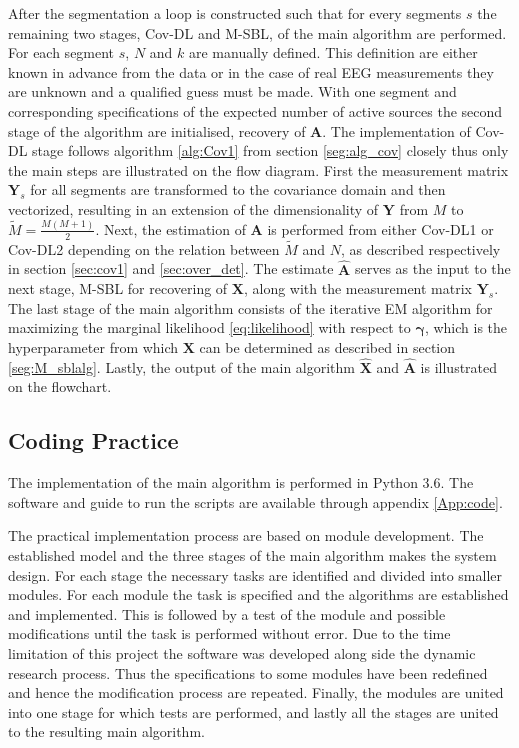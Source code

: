After the segmentation a loop is constructed such that for every segments $s$ the remaining two stages, Cov-DL and M-SBL, of the main algorithm are performed. 
For each segment $s$, $N$ and $k$ are manually defined. 
This definition are either known in advance from the data or in the case of real EEG measurements they are unknown and a qualified guess must be made.
With one segment and corresponding specifications of the expected number of active sources the second stage of the algorithm are initialised, recovery of $\mathbf{A}$.
The implementation of Cov-DL stage follows algorithm \ref{alg:Cov1} from section \ref{seg:alg_cov} closely thus only the main steps are illustrated on the flow diagram.
First the measurement matrix $\mathbf{Y}_s$ for all segments are transformed to the covariance domain and then vectorized, resulting in an extension of the dimensionality of $\mathbf{Y}$ from $M$ to $\widetilde{M} = \frac{M(M+1)}{2}$.
Next, the estimation of $\mathbf{A}$ is performed from either Cov-DL1 or Cov-DL2 depending on the relation between $\widetilde{M}$ and $N$, as described respectively in section \ref{sec:cov1} and \ref{sec:over_det}.
The estimate $\hat{\mathbf{A}}$ serves as the input to the next stage, M-SBL for recovering of $\mathbf{X}$, along with the measurement matrix $\mathbf{Y}_s$. 
The last stage of the main algorithm consists of the iterative EM algorithm for maximizing the marginal likelihood \eqref{eq:likelihood} with respect to $\boldsymbol{\gamma}$, which is the hyperparameter from which $\mathbf{X}$ can be determined as described in section \ref{seg:M_sblalg}. 
Lastly, the output of the main algorithm $\hat{\mathbf{X}}$ and $\hat{\mathbf{A}}$ is illustrated on the flowchart.

\subsection{Coding Practice}
The implementation of the main algorithm is performed in Python 3.6. The software and guide to run the scripts are available through appendix \ref{App:code}.

The practical implementation process are based on module development. 
The established model and the three stages of the main algorithm makes the system design. 
For each stage the necessary tasks are identified and divided into smaller modules. 
For each module the task is specified and the algorithms are established and implemented. 
This is followed by a test of the module and possible modifications until the task is performed without error. 
Due to the time limitation of this project the software was developed along side the dynamic research process. 
Thus the specifications to some modules have been redefined and hence the modification process are repeated. 
Finally, the modules are united into one stage for which tests are performed, and lastly all the stages are united to the resulting main algorithm.

